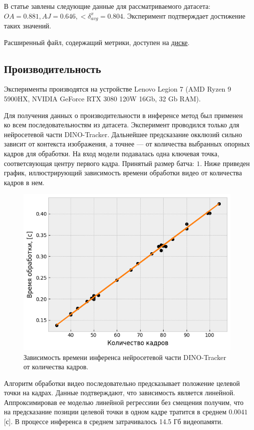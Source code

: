 \documentclass[a4paper, 14pt]{extarticle}
\theoremstyle{definition}
\theoremstyle{plain}
\theoremstyle{remark}
\begin{document}
В статье завлены следующие данные для рассматриваемого датасета:
$OA=0.881, AJ=0.646, <\delta^x_{avg}=0.804$. Эксперимент подтверждает достижение таких значений.

Расширенный файл, содержащий метрики, доступен на \href{https://drive.google.com/file/d/1NcQksZNBh9HBexJbsNAwEITHeBhoiuUi/view?usp=drive_link}{диске}.
\subsection{Производительность}
Эксперименты производятся на устройстве Lenovo Legion 7 (AMD Ryzen 9 5900HX, NVIDIA GeForce RTX 3080 120W 16Gb, 32 Gb RAM).

Для получения данных о производительности в инференсе метод был применен ко всем последовательностям из датасета. Эксперимент проводился только для нейросетевой части DINO-Tracker. Дальнейшее предсказание окклюзий сильно зависит от контекста изображения, а точнее --- от количества выбранных опорных кадров для обработки.
На вход модели подавалась одна ключевая точка, соответсвующая центру первого кадра. Принятый размер батча: $1$.
Ниже приведен график, иллюстрирующий зависимость времени обработки видео от количества кадров в нем. 
\begin{figure}
    [H]
    \centering
    \includegraphics[width=\textwidth]{figs/performance.png}
    \caption{Зависимость времени инференса нейросетевой части DINO-Tracker от количества кадров.}
    \label{fig:performance}
\end{figure}

Алгоритм обработки видео последовательно предсказывает положение целевой точки на кадрах. Данные подтверждают, что зависимость является линейной. Аппроксимировав ее моделью линейной регрессиии без смещения получим, что на предсказание позиции целевой точки в одном кадре тратится в среднем $0.0041$ [с]. В процессе инференса в среднем затрачивалось 14.5 Гб видеопамяти.
\end{document}
